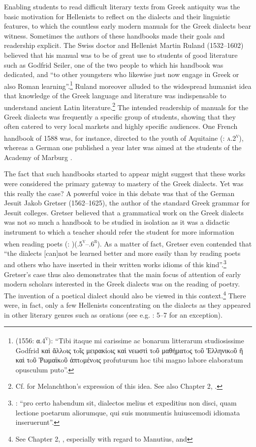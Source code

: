 Enabling students to read difficult literary texts from Greek antiquity was the basic motivation for Hellenists to reflect on the dialects and their linguistic features, to which the countless early modern manuals for the Greek dialects bear witness. Sometimes the authors of these handbooks made their goals and readership explicit. The Swiss doctor and Hellenist Martin Ruland (1532–1602) believed that his manual was to be of great use to students of good literature such as Godfrid Seiler, one of the two people to which his handbook was dedicated, and “to other youngsters who likewise just now engage in Greek or also Roman learning”.\footnote{\citet{Ruland1556} (1556: α.4\textsc{\textsuperscript{v}}): “Tibi itaque mi carissime ac bonarum litterarum studiosissime Godfrid καὶ ἄλλoις τoῖς μειρακίoις καὶ νεωστὶ τoῦ μαθήματoς τoῦ Ἑλληνικoῦ ἢ καὶ τoῦ Ῥωμαϊκoῦ ἁπτoμένoις profuturum hoc tibi magno labore elaboratum opusculum puto”.} Ruland moreover alluded to the widespread humanist idea that knowledge of the Greek language and literature was indispensable to understand ancient Latin literature.\footnote{Cf. \citet[139]{Ben-Tov2009} for Melanchthon’s expression of this idea. See also Chapter 2, .} The intended readership of manuals for the Greek dialects was frequently a specific group of students, showing that they often catered to very local markets and highly specific audiences. One French handbook of 1588 was, for instance, directed to the youth of Aquitaine (\citealt{Baile1588}: \textsc{a.2}\textsc{\textsuperscript{v}}), whereas a German one published a year later was aimed at the students of the Academy of Marburg \citep{Walper1589}.

The fact that such handbooks started to appear might suggest that these works were considered the primary gateway to mastery of the Greek dialects. Yet was this really the case? A powerful voice in this debate was that of the German Jesuit Jakob Gretser (1562–1625), the author of the standard Greek grammar for Jesuit colleges. Gretser believed that a grammatical work on the Greek dialects was not so much a handbook to be studied in isolation as it was a didactic instrument to which a teacher should refer the student for more information when reading poets (\citealt{Gretser1593}: )(.5\textsc{\textsuperscript{v}}–.6\textsc{\textsuperscript{r}}). As a matter of fact, Gretser even contended that “the dialects [can]not be learned better and more easily than by reading poets and others who have inserted in their written works idioms of this kind”.\footnote{\citet[.5\textsc{\textsuperscript{v}}]{Gretser1593}: “pro certo habendum sit, dialectos melius et expeditius non disci, quam lectione poetarum aliorumque, qui suis monumentis huiuscemodi idiomata inseruerunt”.} Gretser’s case thus also demonstrates that the main focus of attention of early modern scholars interested in the Greek dialects was on the reading of poetry. The invention of a poetical dialect should also be viewed in this context.\footnote{See Chapter 2, , especially with regard to Manutius, and } There were, in fact, only a few Hellenists concentrating on the dialects as they appeared in other literary genres such as orations (see e.g. \citealt{Labbe1639}: 5–7 for an exception).

